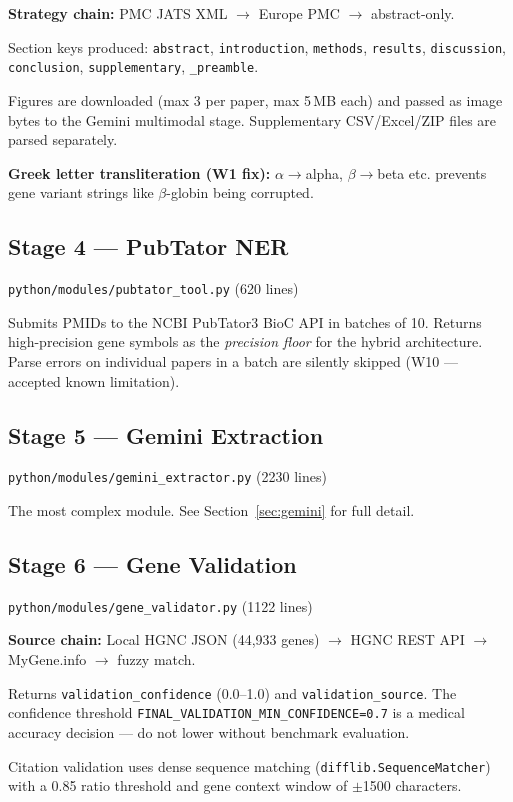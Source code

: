\documentclass[11pt,a4paper]{article}
\newcommand{\codefile}[1]{\texttt{\small\color{gray}#1}}
\begin{document}
\textbf{Strategy chain:} PMC JATS XML $\to$ Europe PMC $\to$ abstract-only.

Section keys produced: \texttt{abstract}, \texttt{introduction}, \texttt{methods}, \texttt{results}, \texttt{discussion}, \texttt{conclusion}, \texttt{supplementary}, \texttt{\_preamble}.

Figures are downloaded (max 3 per paper, max 5\,MB each) and passed as image bytes to the Gemini multimodal stage. Supplementary CSV/Excel/ZIP files are parsed separately.

\textbf{Greek letter transliteration (W1 fix):} $\alpha\to$alpha, $\beta\to$beta etc. prevents gene variant strings like $\beta$-globin being corrupted.

\subsection{Stage 4 --- PubTator NER}
\codefile{python/modules/pubtator\_tool.py} (620 lines)

Submits PMIDs to the NCBI PubTator3 BioC API in batches of 10. Returns high-precision gene symbols as the \textit{precision floor} for the hybrid architecture. Parse errors on individual papers in a batch are silently skipped (W10 --- accepted known limitation).

\subsection{Stage 5 --- Gemini Extraction}
\codefile{python/modules/gemini\_extractor.py} (2230 lines)

The most complex module. See Section~\ref{sec:gemini} for full detail.

\subsection{Stage 6 --- Gene Validation}
\codefile{python/modules/gene\_validator.py} (1122 lines)

\textbf{Source chain:} Local HGNC JSON (44,933 genes) $\to$ HGNC REST API $\to$ MyGene.info $\to$ fuzzy match.

Returns \texttt{validation\_confidence} (0.0--1.0) and \texttt{validation\_source}. The confidence threshold \texttt{FINAL\_VALIDATION\_MIN\_CONFIDENCE=0.7} is a medical accuracy decision --- do not lower without benchmark evaluation.

Citation validation uses dense sequence matching (\texttt{difflib.SequenceMatcher}) with a 0.85 ratio threshold and gene context window of $\pm$1500 characters.
\end{document}
